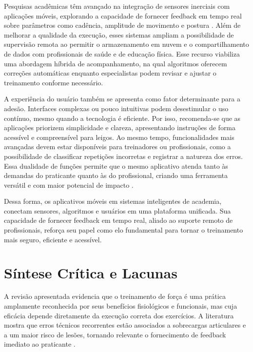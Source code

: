 Pesquisas acadêmicas têm avançado na integração de sensores inerciais com aplicações móveis, explorando a capacidade de fornecer feedback em tempo real sobre parâmetros como cadência, amplitude de movimento e postura \cite{chen-analysis-2024,xia_volearn_2022}. Além de melhorar a qualidade da execução, esses sistemas ampliam a possibilidade de supervisão remota ao permitir o armazenamento em nuvem e o compartilhamento de dados com profissionais de saúde e de educação física. Esse recurso viabiliza uma abordagem híbrida de acompanhamento, na qual algoritmos oferecem correções automáticas enquanto especialistas podem revisar e ajustar o treinamento conforme necessário.  

A experiência do usuário também se apresenta como fator determinante para a adesão. Interfaces complexas ou pouco intuitivas podem desestimular o uso contínuo, mesmo quando a tecnologia é eficiente. Por isso, recomenda-se que as aplicações priorizem simplicidade e clareza, apresentando instruções de forma acessível e compreensível para leigos. Ao mesmo tempo, funcionalidades mais avançadas devem estar disponíveis para treinadores ou profissionais, como a possibilidade de classificar repetições incorretas e registrar a natureza dos erros. Essa dualidade de funções permite que o mesmo aplicativo atenda tanto às demandas do praticante quanto às do profissional, criando uma ferramenta versátil e com maior potencial de impacto \cite{bonifacio2010aplicando}.  

Dessa forma, os aplicativos móveis em sistemas inteligentes de academia, conectam sensores, algoritmos e usuários em uma plataforma unificada. Sua capacidade de fornecer feedback em tempo real, aliado ao suporte remoto de profissionais, reforça seu papel como elo fundamental para tornar o treinamento mais seguro, eficiente e acessível.

\section{Síntese Crítica e Lacunas}

A revisão apresentada evidencia que o treinamento de força é uma prática amplamente reconhecida por seus benefícios fisiológicos e funcionais, mas cuja eficácia depende diretamente da execução correta dos exercícios. A literatura mostra que erros técnicos recorrentes estão associados a sobrecargas articulares e a um maior risco de lesões, tornando relevante o fornecimento de feedback imediato ao praticante \cite{william-j-kraemer-fundamentos-2021,chen-analysis-2024}.  

